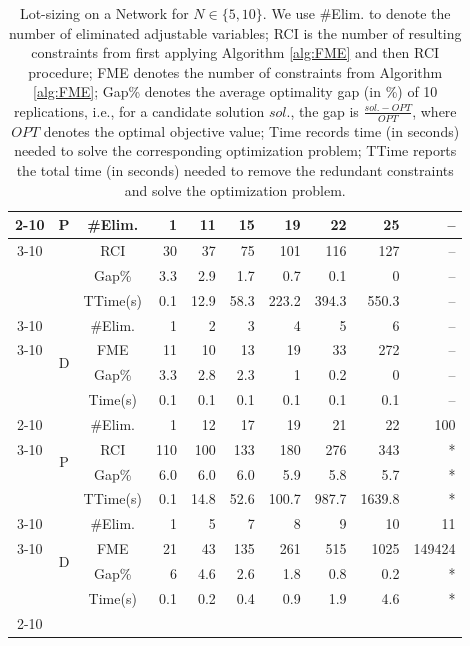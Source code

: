 \documentclass[fleqn,mnsc,blindrev]{informs4}
\begin{document}
		\begin{table}[t]
			\centering
			\caption{Lot-sizing on a Network for $N\in \{5,10 \}$.  We use \#Elim. to denote the number of eliminated adjustable variables;  RCI is the number of resulting constraints from first applying Algorithm \ref{alg:FME} and then RCI procedure; FME denotes the number of constraints from Algorithm \ref{alg:FME};  Gap\% denotes the average optimality gap (in \%)  of 10 replications, i.e., for a candidate solution $sol.$, the gap is $\frac{sol. - OPT}{OPT}$,  {where $OPT$ denotes the optimal objective value}; Time records time (in seconds) needed to solve the corresponding optimization problem; TTime reports the total time (in seconds) needed to remove the redundant constraints and solve the optimization problem.}
\def\arraystretch{1.3}\begin{tabular}{ccc|rrrrrrr}
	\cline{2-10}
\multirow{8}{*}{N=5} &\multirow{4}{*}{P} & \#Elim. & 1     & 11    & 15    & 19    & 22    & 25 & --\\ \cline{3-10}
	&	&  RCI & 30 & 37& 75 & 101 &  116 &    127  & -- \\  
	&& Gap\% & 3.3   & 2.9   & 1.7   & 0.7   & 0.1   & 0 & --\\
	&& TTime(s)  & 0.1   & 12.9   & 58.3   & 223.2   & 394.3  &   550.3  & -- \\ \cline{3-10}
	&  \multirow{4}{*}{D} & \#Elim. & 1     & 2     & 3     & 4     & 5     & 6 & --\\  \cline{3-10}
	&& FME & 11 & 10 & 13 &19 &  33 &  272 & -- \\ 
	&& Gap\% & 3.3   & 2.8   & 2.3   & 1     & 0.2   & 0  & --\\  
	&& Time(s) & 0.1   & 0.1   & 0.1   & 0.1   & 0.1   &    0.1 & -- \\ \cline{2-10}
\multirow{8}{*}{N=10} &\multirow{4}{*}{P} & \#Elim. &   1     & 12    & 17    & 19    & 21    & 22    & 100 \\ \cline{3-10}
	&	& RCI   & 110 & 100 & 133& 180 & 276 &  343 & * \\ 
	&& Gap\% & 6.0   & 6.0   & 6.0   & 5.9   & 5.8   &  5.7 & * \\
	&& TTime(s)  &  0.1   & 14.8  & 52.6   & 100.7   & 987.7  &   1639.8 & * \\ \cline{3-10}
	&\multirow{4}{*}{D}& \#Elim. & 1     & 5     & 7     & 8     & 9     & 10    & 11 \\ \cline{3-10}
	&& FME  & 21 & 43 &135 & 261 &  515 &  1025 & 149424 \\ 
	&& Gap\% & 6     & 4.6   & 2.6   & 1.8   & 0.8   &  0.2   & * \\
	&& Time(s) & 0.1   & 0.2   & 0.4   & 0.9   & 1.9   &   4.6    & * \\ \cline{2-10}
\end{tabular}%
			\label{tab:lsons}%
		\end{table}
\end{document}

